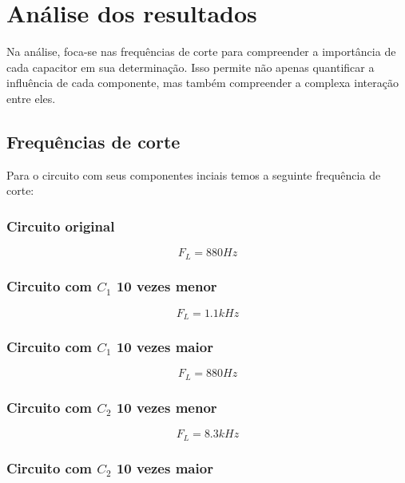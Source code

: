 \section{Análise dos resultados}

Na análise, foca-se nas frequências de corte para compreender a importância de cada capacitor em sua determinação. Isso permite não apenas quantificar a influência de cada componente, mas também compreender a complexa interação entre eles.

\subsection{Frequências de corte}

Para o circuito com seus componentes inciais temos a seguinte frequência de corte:

\subsubsection{Circuito original}

\begin{equation}
    F_L = 880 Hz
\end{equation}

\subsubsection{Circuito com $C_1$ 10 vezes menor}

\begin{equation}
    F_L = 1.1 kHz
\end{equation}

\subsubsection{Circuito com $C_1$ 10 vezes maior}

\begin{equation}
    F_L = 880 Hz
\end{equation}

\subsubsection{Circuito com $C_2$ 10 vezes menor}

\begin{equation}
    F_L = 8.3 kHz
\end{equation}

\subsubsection{Circuito com $C_2$ 10 vezes maior}

